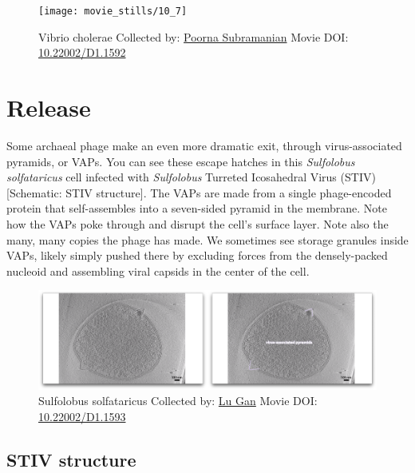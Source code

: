 \documentclass[]{tufte-book}
\begin{document}
\begin{figure}
\texttt{[image: movie\_stills/10\_7]} \caption[Vibrio cholerae Collected by:
\protect\hyperlink{poorna_subramanian}{Poorna Subramanian} Movie DOI:
\href{https://doi.org/10.22002/D1.1592}{10.22002/D1.1592}]{Vibrio cholerae Collected by:
\protect\hyperlink{poorna_subramanian}{Poorna Subramanian} Movie DOI:
\href{https://doi.org/10.22002/D1.1592}{10.22002/D1.1592}}\label{fig:10-7}
\end{figure}

\section{Release}\label{release}

Some archaeal phage make an even more dramatic exit, through
virus-associated pyramids, or VAPs. You can see these escape hatches in
this \emph{Sulfolobus solfataricus} cell infected with \emph{Sulfolobus}
Turreted Icosahedral Virus (STIV) {[}Schematic: STIV structure{]}. The
VAPs are made from a single phage-encoded protein that self-assembles
into a seven-sided pyramid in the membrane. Note how the VAPs poke
through and disrupt the cell's surface layer. Note also the many, many
copies the phage has made. We sometimes see storage granules inside
VAPs, likely simply pushed there by excluding forces from the
densely-packed nucleoid and assembling viral capsids in the center of
the cell.





\begin{figure}
\includegraphics{movie_stills/10_8} \caption[Sulfolobus solfataricus Collected by:
\protect\hyperlink{lu_gan}{Lu Gan} Movie DOI:
\href{https://doi.org/10.22002/D1.1593}{10.22002/D1.1593}]{Sulfolobus solfataricus Collected by:
\protect\hyperlink{lu_gan}{Lu Gan} Movie DOI:
\href{https://doi.org/10.22002/D1.1593}{10.22002/D1.1593}}\label{fig:10-8}
\end{figure}

\subsection{STIV structure}\label{STIV_structure}
\end{document}
